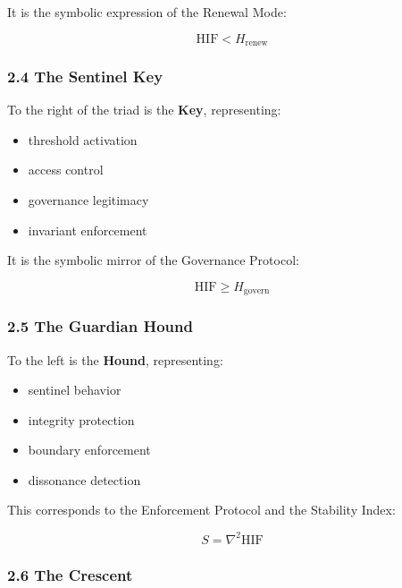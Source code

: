 It is the symbolic expression of the Renewal Mode:

\[
\text{HIF} < H_{\text{renew}}
\]

\subsubsection{2.4 The Sentinel Key}\label{the-sentinel-key}

To the right of the triad is the \textbf{Key}, representing:

\begin{itemize}
\tightlist
\item
  threshold activation\\
\item
  access control\\
\item
  governance legitimacy\\
\item
  invariant enforcement
\end{itemize}

It is the symbolic mirror of the Governance Protocol:

\[
\text{HIF} \ge H_{\text{govern}}
\]

\subsubsection{2.5 The Guardian Hound}\label{the-guardian-hound}

To the left is the \textbf{Hound}, representing:

\begin{itemize}
\tightlist
\item
  sentinel behavior\\
\item
  integrity protection\\
\item
  boundary enforcement\\
\item
  dissonance detection
\end{itemize}

This corresponds to the Enforcement Protocol and the Stability Index:

\[
S = \nabla^2 \text{HIF}
\]

\subsubsection{2.6 The Crescent}\label{the-crescent}

